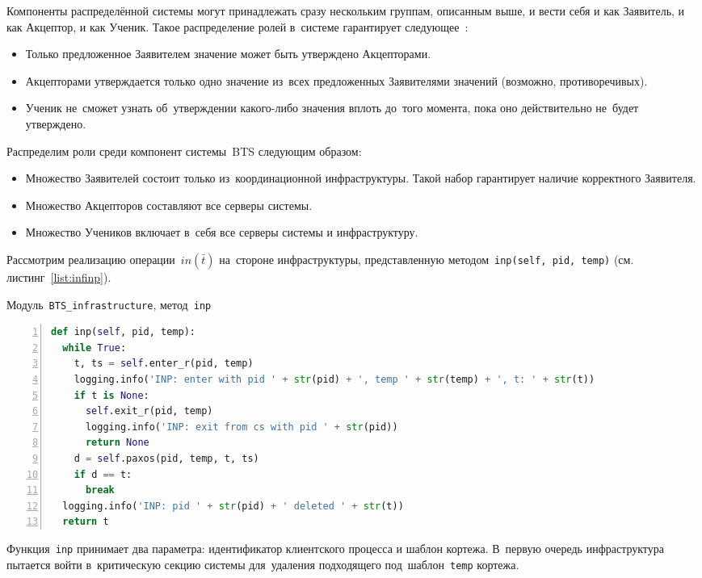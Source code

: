 Компоненты распределённой системы могут принадлежать сразу нескольким группам, описанным выше, и вести себя и как Заявитель, и как Акцептор, и как Ученик. Такое распределение ролей в~системе гарантирует следующее~\autocite{Lamport}:
\begin{itemize}
	\item Только предложенное Заявителем значение может быть утверждено Акцепторами.
	\item Акцепторами утверждается только одно значение из~всех предложенных Заявителями значений (возможно, противоречивых).
	\item Ученик не~сможет узнать об~утверждении какого-либо значения вплоть до~того момента, пока оно действительно не~будет утверждено.
\end{itemize}

Распределим роли среди компонент системы~BTS следующим образом:
\begin{itemize}
	\item Множество Заявителей состоит только из~координационной инфраструктуры. Такой набор гарантирует наличие корректного Заявителя.
	\item Множество Акцепторов составляют все серверы системы.
	\item Множество Учеников включает в~себя все серверы системы и инфраструктуру.
\end{itemize}

Рассмотрим реализацию операции~$in(\bar t)$ на~стороне инфраструктуры, представленную методом~\texttt{inp(self, pid, temp)} (см.\,листинг~\ref{list:infinp}). 
\begin{ListingEnv}\caption{Модуль~\texttt{BTS\_infrastructure}, метод~\texttt{inp}}\label{list:infinp}
	\begin{lstlisting}[language=Python, numbers=left]
def inp(self, pid, temp):
  while True:
    t, ts = self.enter_r(pid, temp)
    logging.info('INP: enter with pid ' + str(pid) + ', temp ' + str(temp) + ', t: ' + str(t))
    if t is None:
      self.exit_r(pid, temp)
      logging.info('INP: exit from cs with pid ' + str(pid))
      return None
    d = self.paxos(pid, temp, t, ts)   
    if d == t:
      break
  logging.info('INP: pid ' + str(pid) + ' deleted ' + str(t))
  return t
	\end{lstlisting}
\end{ListingEnv}
Функция~\texttt{inp} принимает два параметра: идентификатор клиентского процесса и шаблон кортежа. В~первую очередь инфраструктура пытается войти в~критическую секцию системы для~удаления подходящего под~шаблон~\texttt{temp} кортежа.


